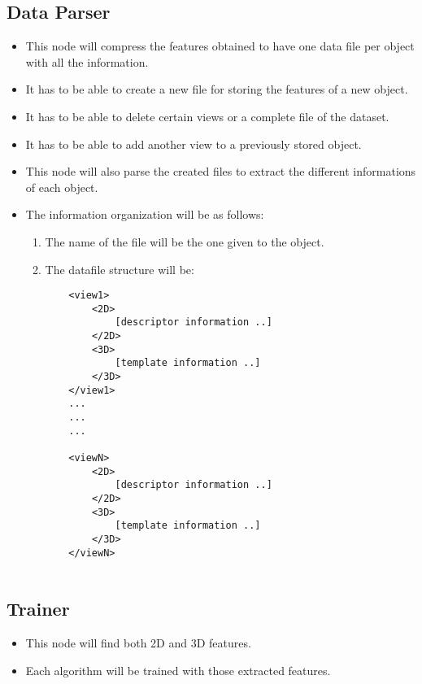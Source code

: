\documentclass{article}
\begin{document}
\subsection{Data Parser}
\begin{itemize}
\item This node will compress the features obtained to have one data file per object with all the information.
 
\item It has to be able to create a new file for storing the features of a new object. 
\item It has to be able to delete certain views or a complete file of the dataset. 
\item It has to be able to add another view to a previously stored object. 

\item This node will also parse the created files to extract the different informations of each object. 

\item The information organization will be as follows: 
	\begin{enumerate}
	\item The name of the file will be the one given to the object. 
	\item The datafile structure will be: \\
		\begin{lstlisting}
	<view1>
		<2D>
			[descriptor information ..]
		</2D>
		<3D>
			[template information ..]
		</3D>
	</view1>	
	...
	...
	...		
			
	<viewN>
		<2D>
			[descriptor information ..]
		</2D>
		<3D>
			[template information ..]
		</3D>
	</viewN>	
		
		\end{lstlisting}
	\end{enumerate}
	
\end{itemize}

\subsection{Trainer}
\begin{itemize}
	\item This node will find both 2D and 3D features. 
	\item Each algorithm will be trained with those extracted features. 
\end{itemize}
\end{document}

